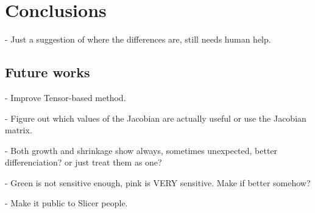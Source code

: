 \chapter{Conclusions}

- Just a suggestion of where the differences are, still needs human help.



\section{Future works}

- Improve Tensor-based method.

- Figure out which values of the Jacobian are actually useful or use the Jacobian matrix.

- Both growth and shrinkage show always, sometimes unexpected, better differenciation? or just treat them as one?

- Green is not sensitive enough, pink is VERY sensitive. Make if better somehow?

- Make it public to Slicer people.

